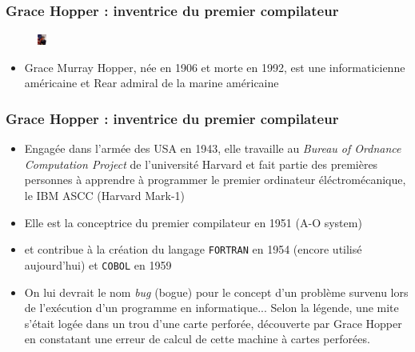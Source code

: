 \documentclass{beamer}
\newcommand{\mypause}{\pause}
\newcommand{\prog}[1]{\alert{\texttt{#1}}}
\begin{document}
\frame
{
\frametitle{Grace Hopper : inventrice du premier compilateur}
  \vspace*{125pt}
  \begin{figure}
    \includegraphics[height=10pt]{Commodore_Grace_M._Hopper_USN.jpg}
  \end{figure}
  \begin{itemize}
    \item Grace Murray Hopper, née en 1906 et morte en 1992, est une informaticienne américaine et Rear admiral de la marine américaine
  \end{itemize}
}

\frame
{
\frametitle{Grace Hopper : inventrice du premier compilateur}
\begin{itemize}
\item Engagée dans l'armée des USA en 1943, elle travaille au \emph{Bureau of Ordnance Computation Project} de l'université Harvard et fait partie des premières personnes à apprendre à programmer le premier ordinateur éléctromécanique, le IBM ASCC (Harvard Mark-1) \mypause{}
\item Elle est la conceptrice du premier compilateur en 1951 (A-O system)
\item et contribue à la création du langage \prog{FORTRAN} en 1954 (encore utilisé aujourd'hui) et \prog{COBOL} en 1959 \mypause{}
\item On lui devrait le nom \emph{bug} (bogue) pour le concept d'un problème survenu lors de l'exécution d'un programme en informatique...
  Selon la légende, une mite s'était logée dans un trou d'une carte perforée, découverte par Grace Hopper en constatant une erreur de calcul de cette machine à cartes perforées.
\end{itemize}
}
\end{document}
